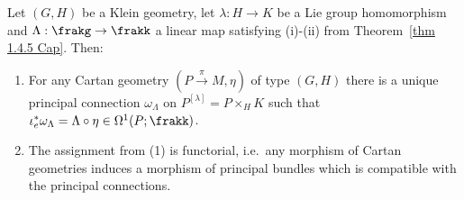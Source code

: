 \begin{thm}\label{thm 1.5.6 Cap}
    Let $(G,H)$ be a Klein geometry, let $\lambda:H\to K$ be a Lie group homomorphism and $\Lambda:\frakg\to \frakk$ a linear map satisfying (i)-(ii) from Theorem~\ref{thm 1.4.5 Cap}. Then:
    \begin{enumerate}[label=(\arabic*)]
        \item For any Cartan geometry $(P\overset{\pi}{\to} M,\eta)$ of type $(G,H)$ there is a unique principal connection $\omega_\Lambda$ on $P^{[\lambda]}=P\times_H K$ such that $\iota_e^\ast \omega_\Lambda=\Lambda\circ \eta\in\Omega^1({P;\frakk})$.
        \item The assignment from (1) is functorial, i.e.\ any morphism of Cartan geometries induces a morphism of principal bundles which is compatible with the principal connections.
    \end{enumerate}
\end{thm}
